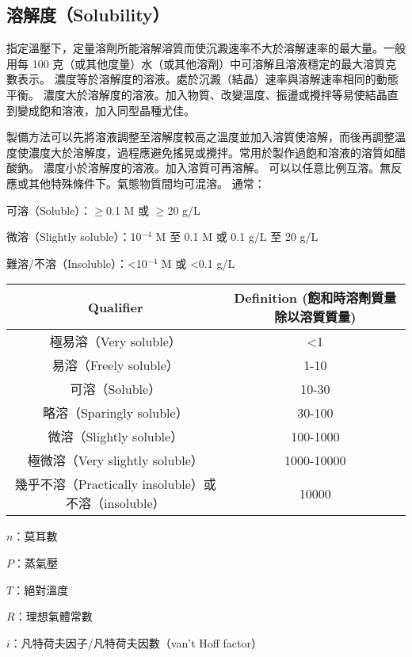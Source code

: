 \documentclass[a4paper,12pt]{article}
\begin{document}
\subsection{溶解度（Solubility）}
指定溫壓下，定量溶劑所能溶解溶質而使沉澱速率不大於溶解速率的最大量。一般用每 100 克（或其他度量）水（或其他溶劑）中可溶解且溶液穩定的最大溶質克數表示。
濃度等於溶解度的溶液。處於沉澱（結晶）速率與溶解速率相同的動態平衡。
濃度大於溶解度的溶液。加入物質、改變溫度、振盪或攪拌等易使結晶直到變成飽和溶液，加入同型晶種尤佳。

製備方法可以先將溶液調整至溶解度較高之溫度並加入溶質使溶解，而後再調整溫度使濃度大於溶解度，過程應避免搖晃或攪拌。常用於製作過飽和溶液的溶質如醋酸鈉。
濃度小於溶解度的溶液。加入溶質可再溶解。
可以以任意比例互溶。無反應或其他特殊條件下。氣態物質間均可混溶。
通常：
\bit
\item 可溶（Soluble）：$\geq$0.1 M 或 $\geq$20 g/L
\item 微溶（Slightly soluble）：10$^{-4}$ M 至 0.1 M 或 0.1 g/L 至 20 g/L
\item 難溶/不溶（Insoluble）：<10$^{-4}$ M 或 <0.1 g/L
\eit
{}
\begin{longtable}[c]{|c|c|}
\hline
Qualifier & Definition (飽和時溶劑質量除以溶質質量) \\\hline
極易溶（Very soluble）& <1 \\\hline
易溶（Freely soluble） & 1-10 \\\hline
可溶（Soluble）& 10-30 \\\hline
略溶（Sparingly soluble）&30-100 \\\hline
微溶（Slightly soluble）&100-1000 \\\hline
極微溶（Very slightly soluble）&1000-10000 \\\hline
幾乎不溶（Practically insoluble）或不溶（insoluble）&10000 \\\hline
\end{longtable}\FB
{}
\bit
\item $n$：莫耳數
\item $P$：蒸氣壓
\item $T$：絕對溫度
\item $R$：理想氣體常數
\item $i$：凡特荷夫因子/凡特荷夫因數（van't Hoff factor）
\end{document}
